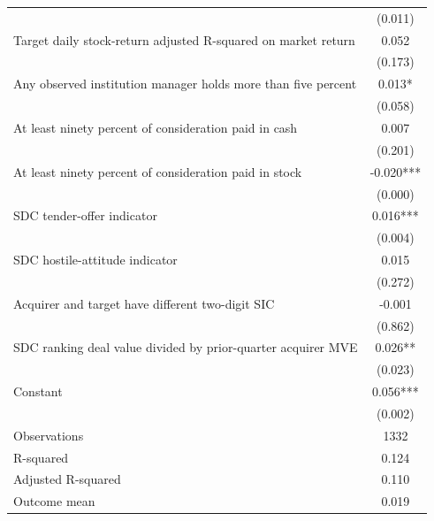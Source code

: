 {\begin{tabular}{l*{1}{c}}
                    &     (0.011)   \\
Target daily stock-return adjusted R-squared on market return&       0.052   \\
                    &     (0.173)   \\
Any observed institution manager holds more than five percent&       0.013*  \\
                    &     (0.058)   \\
At least ninety percent of consideration paid in cash&       0.007   \\
                    &     (0.201)   \\
At least ninety percent of consideration paid in stock&      -0.020***\\
                    &     (0.000)   \\
SDC tender-offer indicator&       0.016***\\
                    &     (0.004)   \\
SDC hostile-attitude indicator&       0.015   \\
                    &     (0.272)   \\
Acquirer and target have different two-digit SIC&      -0.001   \\
                    &     (0.862)   \\
SDC ranking deal value divided by prior-quarter acquirer MVE&       0.026** \\
                    &     (0.023)   \\
Constant            &       0.056***\\
                    &     (0.002)   \\
\hline
Observations        &        1332   \\
R-squared           &       0.124   \\
Adjusted R-squared  &       0.110   \\
Outcome mean        &       0.019   \\
\hline\hline
\end{tabular}
}
